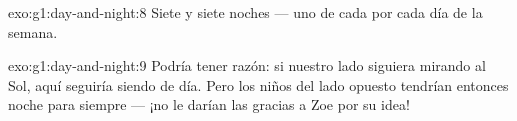 \begin{solution}{exo:g1:day-and-night:8}
Siete  y siete noches --- uno de cada por cada día de la
semana.
\end{solution}

\begin{solution}{exo:g1:day-and-night:9}
Podría tener razón: si nuestro lado siguiera mirando al Sol, aquí
seguiría siendo de día. Pero los niños del lado opuesto tendrían
entonces noche para siempre --- ¡no le darían las gracias a Zoe por su
idea!
\end{solution}
